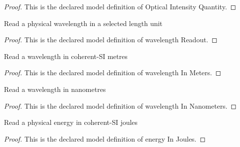 \begin{proof}
  This is the declared model definition of Optical Intensity Quantity.
\end{proof}
\begin{definition}
  \label{def:physics:phyx-mini-0537:phyxminiproblems-problemphyxmini0537-wavelengthreadout}
  Read a physical wavelength in a selected length unit
\end{definition}
\begin{proof}
  This is the declared model definition of wavelength Readout.
\end{proof}
\begin{definition}
  \label{def:physics:phyx-mini-0537:phyxminiproblems-problemphyxmini0537-wavelengthinmeters}
  Read a wavelength in coherent-SI metres
\end{definition}
\begin{proof}
  This is the declared model definition of wavelength In Meters.
\end{proof}
\begin{definition}
  \label{def:physics:phyx-mini-0537:phyxminiproblems-problemphyxmini0537-wavelengthinnanometers}
  Read a wavelength in nanometres
\end{definition}
\begin{proof}
  This is the declared model definition of wavelength In Nanometers.
\end{proof}
\begin{definition}
  \label{def:physics:phyx-mini-0537:phyxminiproblems-problemphyxmini0537-energyinjoules}
  Read a physical energy in coherent-SI joules
\end{definition}
\begin{proof}
  This is the declared model definition of energy In Joules.
\end{proof}
